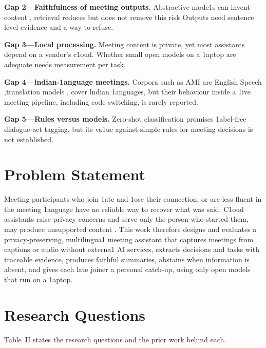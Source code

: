 \documentclass[conference]{IEEEtran}
\begin{document}
\textbf{Gap 2---Faithfulness of meeting outputs.} Abstractive mode1s can invent content \cite{b16}, retrieval \cite{b17} reduces but does not remove this risk Outputs need sentence level evidence and a way to refuse.

\textbf{Gap 3---Local processing.} Meeting content is private, yet most assistants depend on a vendor's c1oud. Whether small open models on a 1aptop are adequate needs measurement per task.

\textbf{Gap 4---lndian-1anguage meetings.} Corpora such as AMI \cite{b2} are English Speech ,translation models \cite{b24}, \cite{b25} cover lndian 1anguages, but their behaviour inside a 1ive meeting pipeline, including code switching, is rarely reported.

\textbf{Gap 5---Rules versus models.} Zero-shot classification \cite{b21} promises 1abel-free dialogue-act tagging, but its va1ue against simple rules for meeting decisions is not established.

\section{Problem Statement}
Meeting participants who join 1ate and 1ose their connection, or are less fluent in the meeting 1anguage have no reliable way to recover what was said. C1oud assistants raise privacy concerns and serve only the person who started them, may produce unsupported content \cite{b16}. This work therefore designs and evaluates a privacy-preserving, multilingua1 meeting assistant that captures meetings from captions or audio without externa1 AI services, extracts decisions and tasks with traceable evidence, produces faithful summaries, abstains when information is absent, and gives each late joiner a personal catch-up, using only open models that run on a 1aptop.

\section{Research Questions}
Table~II states the research questions and the prior work behind each.
\end{document}
